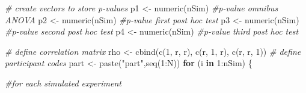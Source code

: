 \documentclass[
]{book}
\newenvironment{Shaded}{\begin{snugshade}}{\end{snugshade}}
\newcommand{\CommentTok}[1]{\textcolor[rgb]{0.56,0.35,0.01}{\textit{#1}}}
\newcommand{\ControlFlowTok}[1]{\textcolor[rgb]{0.13,0.29,0.53}{\textbf{#1}}}
\newcommand{\DecValTok}[1]{\textcolor[rgb]{0.00,0.00,0.81}{#1}}
\newcommand{\FunctionTok}[1]{\textcolor[rgb]{0.00,0.00,0.00}{#1}}
\newcommand{\NormalTok}[1]{#1}
\newcommand{\OtherTok}[1]{\textcolor[rgb]{0.56,0.35,0.01}{#1}}
\newcommand{\SpecialCharTok}[1]{\textcolor[rgb]{0.00,0.00,0.00}{#1}}
\newcommand{\StringTok}[1]{\textcolor[rgb]{0.31,0.60,0.02}{#1}}
\begin{document}
\begin{Shaded}
\begin{Highlighting}[]
\CommentTok{\# create vectors to store p{-}values}
\NormalTok{p1 }\OtherTok{\textless{}{-}} \FunctionTok{numeric}\NormalTok{(nSim) }\CommentTok{\#p{-}value omnibus ANOVA}
\NormalTok{p2 }\OtherTok{\textless{}{-}} \FunctionTok{numeric}\NormalTok{(nSim) }\CommentTok{\#p{-}value first post hoc test}
\NormalTok{p3 }\OtherTok{\textless{}{-}} \FunctionTok{numeric}\NormalTok{(nSim) }\CommentTok{\#p{-}value second post hoc test}
\NormalTok{p4 }\OtherTok{\textless{}{-}} \FunctionTok{numeric}\NormalTok{(nSim) }\CommentTok{\#p{-}value third post hoc test}

\CommentTok{\# define correlation matrix}
\NormalTok{rho }\OtherTok{\textless{}{-}} \FunctionTok{cbind}\NormalTok{(}\FunctionTok{c}\NormalTok{(}\DecValTok{1}\NormalTok{, r, r), }\FunctionTok{c}\NormalTok{(r, }\DecValTok{1}\NormalTok{, r), }\FunctionTok{c}\NormalTok{(r, r, }\DecValTok{1}\NormalTok{))}
\CommentTok{\# define participant codes}
\NormalTok{part }\OtherTok{\textless{}{-}} \FunctionTok{paste}\NormalTok{(}\StringTok{"part"}\NormalTok{,}\FunctionTok{seq}\NormalTok{(}\DecValTok{1}\SpecialCharTok{:}\NormalTok{N))}
\ControlFlowTok{for}\NormalTok{ (i }\ControlFlowTok{in} \DecValTok{1}\SpecialCharTok{:}\NormalTok{nSim) \{}
  
  \CommentTok{\#for each simulated experiment}


\end{Highlighting}
\end{Shaded}
\end{document}
